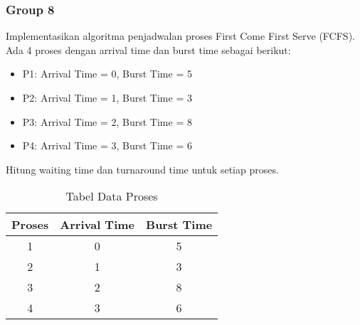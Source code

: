 \documentclass[12pt]{article}
\begin{document}
\subsubsection{}
\subsubsection{}
\subsubsection{}
\subsubsection{}
\subsubsection{}
\subsubsection{}
\subsubsection{Group 8}
Implementasikan algoritma penjadwalan proses First Come First Serve (FCFS). Ada 4 proses dengan arrival time dan burst time sebagai berikut:
\begin{itemize}
    \item P1: Arrival Time = 0, Burst Time = 5
    \item P2: Arrival Time = 1, Burst Time = 3
    \item P3: Arrival Time = 2, Burst Time = 8
    \item P4: Arrival Time = 3, Burst Time = 6
\end{itemize}
Hitung waiting time dan turnaround time untuk setiap proses.
\begin{table}[htbp] %
    \centering
    \begin{tabular}{|c|c|c|} %
    \hline
    Proses  & Arrival Time  & Burst Time  \\ %
    \hline
    1  & 0 & 5 \\ %
    \hline
    2 & 1 &3 \\
    \hline
    3 & 2 & 8 \\
    \hline
    4 & 3 & 6 \\
    
    \hline
    \end{tabular}
    \caption{Tabel Data Proses} %
    \label{tab:your_label} %
\end{table}
\end{document}
